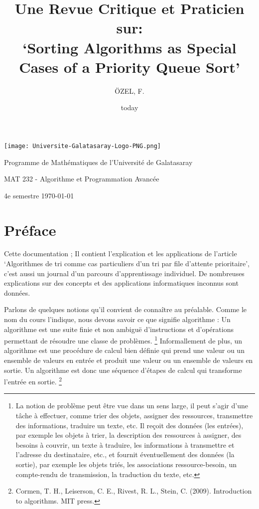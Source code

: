 \documentclass{article}
\title{Une Revue Critique et Praticien sur: \\ `Sorting Algorithms as Special Cases of a Priority Queue Sort'}
\author{ÖZEL, F.}
\date{today}
\begin{document}
    \begin{titlepage}

        \centering

        \texttt{[image: Universite-Galatasaray-Logo-PNG.png]}\par\vspace{3cm}
        {\huge \thetitle \par}
        \vspace{1cm}
        {\large \textit \theauthor \par}
        \vfill
        {\large Programme de Mathématiques de l'Université de Galatasaray \par MAT 232 - Algorithme et Programmation Avancée \par 4e semestre \today \par}

    \end{titlepage}


    \section*{Préface}

        Cette documentation ; Il contient l'explication et les applications de l'article `Algorithmes de tri comme cas particuliers d'un tri par file d'attente prioritaire', c'est aussi un journal d'un parcours d'apprentissage individuel. De nombreuses explications sur des concepts et des applications informatiques inconnus sont données.

        Parlons de quelques notions qu'il convient de connaître au préalable. Comme le nom du cours l'indique, nous devons savoir ce que signifie algorithme : Un algorithme est une suite finie et non ambiguë d'instructions et d'opérations permettant de résoudre une classe de problèmes. \footnote{La notion de problème peut être vue dans un sens large, il peut s'agir d'une tâche à effectuer, comme trier des objets, assigner des ressources, transmettre des informations, traduire un texte, etc. Il reçoit des données (les entrées), par exemple les objets à trier, la description des ressources à assigner, des besoins à couvrir, un texte à traduire, les informations à transmettre et l'adresse du destinataire, etc., et fournit éventuellement des données (la sortie), par exemple les objets triés, les associations ressource-besoin, un compte-rendu de transmission, la traduction du texte, etc.} Informallement de plus, un algorithme est une procédure de calcul bien définie qui prend une valeur ou un ensemble de valeurs en entrée et produit une valeur ou un ensemble de valeurs en sortie. Un algorithme est donc une séquence d'étapes de calcul qui transforme l'entrée en sortie. \footnote{Cormen, T. H., Leiserson, C. E., Rivest, R. L.,  Stein, C. (2009). Introduction to algorithms. MIT press.}
\end{document}

